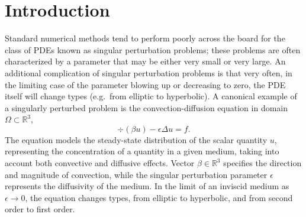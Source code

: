 \section{Introduction}

Standard numerical methods tend to perform poorly across the board for the class of PDEs known as singular perturbation problems; these problems are often characterized by a parameter that may be either very small or very large.  An additional complication of singular perturbation problems is that very often, in the limiting case of the parameter blowing up or decreasing to zero, the PDE itself will change types (e.g.\ from elliptic to hyperbolic).  A canonical example of a singularly perturbed problem is the convection-diffusion equation in domain $\Omega \subset \mathbb{R}^3$,
\[
\div \left(\beta u\right) - \epsilon \Delta u = f.
\]
The equation models the steady-state distribution of the scalar quantity $u$, representing the concentration of a quantity in a given medium, taking into account both convective and diffusive effects. Vector $\beta \in \mathbb{R}^3$ specifies the direction and magnitude of convection, while the singular perturbation parameter $\epsilon$ represents the diffusivity of the medium. In the limit of an inviscid medium as $\epsilon\rightarrow 0$, the equation changes types, from elliptic to hyperbolic, and from second order to first order.

